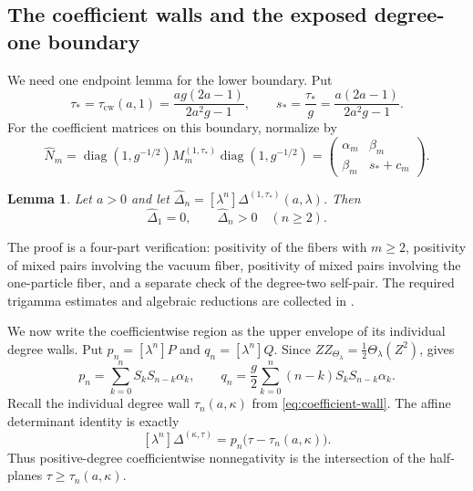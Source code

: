 \documentclass[11pt,a4paper]{amsart}
\numberwithin{equation}{section}
\theoremstyle{plain}
\newtheorem{lemma}[theorem]{Lemma}
\theoremstyle{definition}
\newcommand{\diag}{\operatorname{diag}}
\newcommand{\Thetal}{\Theta_{\lambda}}
\begin{document}
\subsection{The coefficient walls and the exposed degree-one boundary}\label{subsec:coefficient-walls-exposed-degree}

We need one endpoint lemma for the lower boundary.  Put
\begin{equation}\label{eq:tau-star-s-star}
 \tau_*=\tau_{\mathrm{cw}}(a,1)=\frac{ag(2a-1)}{2a^2g-1},
 \qquad
 s_*=\frac{\tau_*}{g}=\frac{a(2a-1)}{2a^2g-1}.
\end{equation}
For the coefficient matrices on this boundary, normalize by
\begin{equation}\label{eq:Nhat-m}
 \widehat N_m
 =\diag(1,g^{-1/2})M_m^{(1,\tau_*)}\diag(1,g^{-1/2})
 =\begin{pmatrix}\alpha_m&\beta_m\\ \beta_m&s_*+c_m\end{pmatrix}.
\end{equation}

\begin{lemma}\label{lem:boundary-positivity}
Let \(a>0\) and let
\(\widehat\Delta_n=[\lambda^n]\Delta^{(1,\tau_*)}(a,\lambda)\).  Then
\[
 \widehat\Delta_1=0,
 \qquad
 \widehat\Delta_n>0\quad(n\ge2).
\]
\end{lemma}

The proof is a four-part verification: positivity of the fibers with
\(m\ge2\), positivity of mixed pairs involving the vacuum fiber, positivity of
mixed pairs involving the one-particle fiber, and a separate check of the
degree-two self-pair.  The required
trigamma estimates and algebraic reductions are collected in
.


We now write the coefficientwise region as the upper envelope of its
individual degree walls.  Put \(p_n=[\lambda^n]P\) and \(q_n=[\lambda^n]Q\).
Since \(ZZ_{\Thetal}=\frac12\Thetal(Z^2)\),  gives
\begin{equation}\label{eq:pq-coefficients}
 p_n=\sum_{k=0}^nS_kS_{n-k}\alpha_k,
 \qquad
 q_n=\frac g2\sum_{k=0}^n(n-k)S_kS_{n-k}\alpha_k.
\end{equation}
Recall the individual degree wall \(\tau_n(a,\kappa)\) from
\eqref{eq:coefficient-wall}.  The affine determinant identity is exactly
\begin{equation}\label{eq:coefficient-wall-factor}
 [\lambda^n]\Delta^{(\kappa,\tau)}
 =p_n\bigl(\tau-\tau_n(a,\kappa)\bigr).
\end{equation}
Thus positive-degree coefficientwise nonnegativity is the intersection of the
half-planes \(\tau\ge\tau_n(a,\kappa)\).
\end{document}
